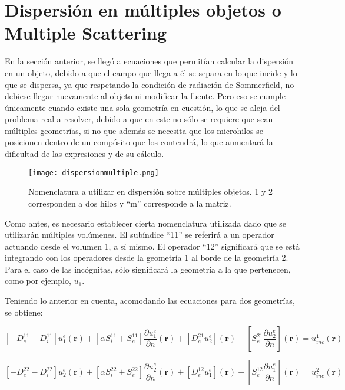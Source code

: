 \documentclass[12pt,letterpaper]{report}
\numberwithin{equation}{section}
\begin{document}
\section{Dispersión en múltiples objetos o Multiple Scattering}


En la sección anterior, se llegó a ecuaciones que permitían calcular la dispersión en un objeto, debido a que el campo que llega a él se separa en lo que incide y lo que se dispersa, ya que respetando la condición de radiación de Sommerfield, no debiese llegar nuevamente al objeto ni modificar la fuente. Pero eso se cumple únicamente cuando existe una sola geometría en cuestión, lo que se aleja del problema real a resolver, debido a que en este no sólo se requiere que sean múltiples geometrías, si no que además se necesita que los microhilos se posicionen dentro de un compósito que los contendrá, lo que aumentará la dificultad de las expresiones y de su cálculo.

\begin{figure}[H]
	\centering\texttt{[image: dispersionmultiple.png]}
	\caption{Nomenclatura a utilizar en dispersión sobre múltiples objetos. 1 y 2 corresponden a dos hilos y ``m'' corresponde a la matriz.}
	\label{fig: dispersionmultiple}
\end{figure} 

Como antes, es necesario establecer cierta nomenclatura utilizada dado que se utilizarán múltiples volúmenes. El subíndice ``11'' se referirá a un operador actuando desde el volumen 1, a sí mismo. El operador ``12'' significará que se está integrando con los operadores desde la geometría 1 al borde de la geometría 2. Para el caso de las incógnitas, sólo significará la geometría a la que pertenecen, como por ejemplo, $u_{1}$. 

Teniendo lo anterior en cuenta, acomodando las ecuaciones para dos geometrías, se obtiene:

\begin{equation}
\left[-D_{e}^{11} - D_{i}^{11}\right] u^{e}_1(\textbf{r}) + \left[\alpha S_{i}^{11} + S_{e}^{11}\right]\frac{\partial u^{e}_1}{\partial n}(\textbf{r}) + \left[D_{e}^{21} u^{e}_2\right](\textbf{r}) - \left[S_{e}^{21} \frac{\partial u^{e}_2}{\partial n}\right](\textbf{r}) = u_{inc}^1(\textbf{r}) 
\label{eq: multi_trans_1}		
\end{equation}

\begin{equation}
\left[-D_{e}^{22} - D_{i}^{22}\right] u^{e}_2(\textbf{r}) + \left[\alpha S_{i}^{22} + S_{e}^{22}\right]\frac{\partial u^{e}_2}{\partial n}(\textbf{r}) + \left[D_{e}^{12} u^{e}_1\right](\textbf{r}) - \left[S_{e}^{12} \frac{\partial u^{e}_1}{\partial n}\right](\textbf{r}) = u_{inc}^2(\textbf{r}) 
\label{eq: multi_trans_2}		
\end{equation}
\end{document}
